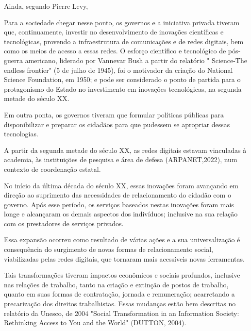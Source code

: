 Ainda, segundo Pierre Levy,


\noindent\begin{center}\mbox{\centering{}}\end{center}


Para a sociedade chegar nesse ponto, os governos e a iniciativa privada tiveram que, continuamente, investir no desenvolvimento de inovações científicas e tecnológicas, provendo a infraestrutura de comunicações e de redes digitais, bem como os meios de acesso a essas redes. O esforço científico e tecnológico de pós-guerra americano, liderado por Vannevar Bush a partir do relatório " Science-The endless frontier" (5 de julho de 1945), foi o motivador da criação do National Science Foundation, em 1950; e pode ser considerado  o ponto de partida para o protagonismo do Estado no investimento em inovações tecnológicas, na segunda metade do século XX.

Em outra ponta, os governos tiveram que formular políticas públicas para disponibilizar e preparar os cidadãos para que pudessem se apropriar dessas tecnologias.

A partir da segunda metade do século XX, as redes digitais estavam vinculadas à academia, às instituições de pesquisa e área de defesa (ARPANET,2022), num contexto de coordenação estatal.

No início da última década do século XX, essas inovações  foram avançando em direção ao suprimento das necessidades de relacionamento do cidadão com o governo. Após esse período, os serviços baseados nestas inovações foram mais longe e alcançaram  os demais aspectos dos indivíduos; inclusive na sua relação com os prestadores de serviços privados.

Essa expansão ocorreu como resultado de várias ações e a sua universalização é consequência do surgimento de novas formas de relacionamento social, viabilizadas pelas redes digitais, que tornaram mais acessíveis novas ferramentas.

Tais transformações tiveram impactos econômicos e sociais profundos, inclusive nas relações de trabalho, tanto na criação e extinção de postos de trabalho,  quanto em suas formas de contratação, jornada e remuneração; acarretando a precarização dos direitos trabalhistas. Essas mudanças estão bem descritas  no relatório da Unesco,  de 2004 "Social Transformation in an Information Society: Rethinking Access to You and the World" (DUTTON, 2004).

